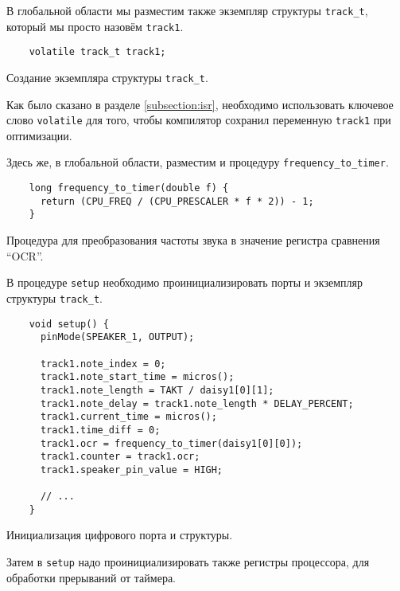 \documentclass[../sparc.tex]{subfiles}
\begin{document}
В глобальной области мы разместим также экземпляр структуры
\texttt{track_t}, который мы просто назовём \texttt{track1}.

\begin{listing}[H]
  \begin{verbatim}
    volatile track_t track1;
  \end{verbatim}
  \caption{Создание экземпляра структуры \texttt{track_t}.}
  \label{listing:mcu-music-5}
\end{listing}

Как было сказано в разделе \ref{subsection:isr}, необходимо использовать
ключевое слово \texttt{volatile} для того, чтобы компилятор сохранил
переменную \texttt{track1} при оптимизации.

Здесь же, в глобальной области, разместим и процедуру
\texttt{frequency_to_timer}.

\begin{listing}[H]
  \begin{verbatim}
    long frequency_to_timer(double f) {
      return (CPU_FREQ / (CPU_PRESCALER * f * 2)) - 1;
    }
  \end{verbatim}
  \caption{Процедура для преобразования частоты звука в значение регистра
    сравнения ``OCR''.}
  \label{listing:mcu-music-6}
\end{listing}

В процедуре \texttt{setup} необходимо проинициализировать порты и
экземпляр структуры \texttt{track_t}.

\begin{listing}[H]
  \begin{verbatim}
    void setup() {
      pinMode(SPEAKER_1, OUTPUT);

      track1.note_index = 0;
      track1.note_start_time = micros();
      track1.note_length = TAKT / daisy1[0][1];
      track1.note_delay = track1.note_length * DELAY_PERCENT;
      track1.current_time = micros();
      track1.time_diff = 0;
      track1.ocr = frequency_to_timer(daisy1[0][0]);
      track1.counter = track1.ocr;
      track1.speaker_pin_value = HIGH;

      // ...
    }
  \end{verbatim}
  \caption{Инициализация цифрового порта и структуры.}
  \label{listing:mcu-music-7}
\end{listing}

Затем в \texttt{setup} надо проинициализировать также регистры
процессора, для обработки прерываний от таймера.
\end{document}

